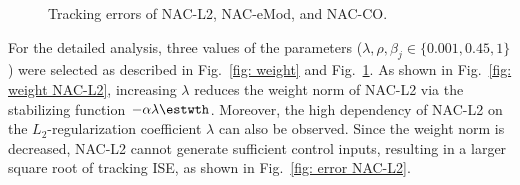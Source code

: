 \documentclass[letterpaper, 10 pt, conference]{ieeeconf}  %
\begin{document}
\begin{figure}[!t]      
    \centering
    \vspace{-2mm}
    \vspace{-2mm}
    \caption{Tracking errors of NAC-L2, NAC-eMod, and NAC-CO.}
    \label{fig: error}
\end{figure}

For the detailed analysis, three values of the parameters (\ie $\lambda,\rho,\beta_j\in\{0.001,0.45,1\}$) were selected as described in Fig.~\ref{fig: weight} and Fig.~\ref{fig: error}.
As shown in Fig.~\ref{fig: weight NAC-L2}, increasing $\lambda$ reduces the weight norm of NAC-L2 via the stabilizing function $-\alpha\lambda{\estwth}$.
Moreover, the high dependency of NAC-L2 on the $L_2$-regularization coefficient $\lambda$ can also be observed.
Since the weight norm is decreased, NAC-L2 cannot generate sufficient control inputs, resulting in a larger square root of tracking ISE, as shown in Fig.~\ref{fig: error NAC-L2}.
\end{document}
